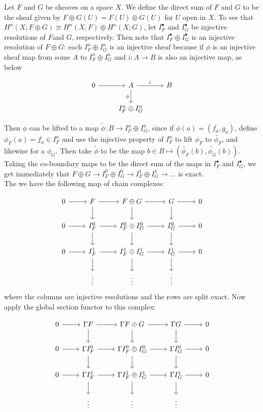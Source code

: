 \documentclass{article}
\begin{document}
\begin{enumerate}
Let $F$ and $G$ be sheaves on a space $X$. We define the direct sum of $F$ and $G$ to be the sheaf given by $F \oplus G (U) = F(U) \oplus G(U)$ for $U$ open in $X$. To see that $H^n(X;F\oplus G)\cong H^n(X;F)\oplus H^n(X;G)$, let $I^\bullet_F$ and $I^\bullet_G$ be injective resolutions of $F$and $G$, respectively. Then note that $I^\bullet_F \oplus I^\bullet_G$ is an injective resolution of $F \oplus G$: each $I^n_F \oplus I^n_G$ is an injective sheaf because if $\phi$ is an injective sheaf map from some $A$ to  $I^n_F \oplus I^n_G$  and $i:A \rightarrow B$ is also an injective map, as below

\[
\begin{tikzcd}
0 \arrow[r] 
& A \arrow[r, "i"] \arrow[d, "\phi"']
& B 
\\
& 
I^n_F \oplus I^n_G
\end{tikzcd}
\] 

Then $\phi$ can be lifted to a map $\tilde{\phi}:B \rightarrow  I^n_F \oplus I^n_G$, since if $\phi(a)=(f_a,g_a)$, define $\phi_F(a)=f_a \in I^n_F$ and use the injective property of $I_F^n$ to lift $\phi_F$ to $\tilde{\phi_F}$, and likewise for a $\phi_G$. Then take $\tilde{\phi}$ to be the map $b \in B \mapsto (\tilde{\phi_F}(b), \tilde{\phi_G}(b))$. Taking the co-boundary maps to be the direct sum of the maps in $I^\bullet_F$ and $I^\bullet_G$, we get immediately that $F \oplus G \rightarrow I^0_F \oplus I^0_G \rightarrow I^1_F \oplus I^1_G \rightarrow \ldots$ is exact.\\

The we have the following map of chain complexes:

\[
\begin{tikzcd}
0 \arrow[r]
& F  \arrow[r] \arrow[d]
& F \oplus G  \arrow[r] \arrow[d]
& G \arrow[r] \arrow[d]
& 0  
\\
0 \arrow[r] 
& I^0_F \arrow[r] \arrow[d]
& I^0_F \oplus I^0_G \arrow[r] \arrow[d]
& I^0_G \arrow[r] \arrow[d]
& 0  
\\
0 \arrow[r]  
& I^1_F \arrow[r] \arrow[d]
& I^1_F \oplus I^1_G \arrow[r] \arrow[d]
& I^1_G \arrow[r] \arrow[d]
& 0  
\\
& \vdots 
& \vdots 
& \vdots
& 
\end{tikzcd}
\]
where the columns are injective resolutions and the rows are split exact. Now apply the global section functor to this complex: 

\[
\begin{tikzcd}
0 \arrow[r]
& \Gamma F  \arrow[r] \arrow[d]
& \Gamma F \oplus G  \arrow[r] \arrow[d]
& \Gamma G \arrow[r] \arrow[d]
& 0  
\\
0 \arrow[r] 
& \Gamma I^0_F \arrow[r] \arrow[d]
& \Gamma I_F^0 \oplus I_G^0 \arrow[r] \arrow[d]
& \Gamma I^0_G \arrow[r] \arrow[d]
& 0  
\\
0 \arrow[r]  
& \Gamma I^1_F \arrow[r] \arrow[d]
& \Gamma I_F^1 \oplus I_G^1 \arrow[r] \arrow[d]
& \Gamma I^1_G \arrow[r] \arrow[d]
& 0  
\\
& \vdots 
& \vdots 
& \vdots
& 
\end{tikzcd}
\]


\end{enumerate}
\end{document}
